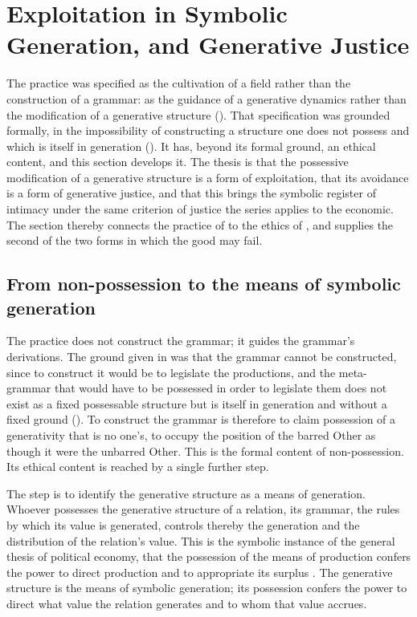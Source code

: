 \section{Exploitation in Symbolic Generation, and Generative Justice}
\label{p10:sec:exploitation}

\noindent
The practice was specified as the cultivation of a field rather than the construction of a grammar: as the guidance of a generative dynamics rather than the modification of a generative structure (). That specification was grounded formally, in the impossibility of constructing a structure one does not possess and which is itself in generation (). It has, beyond its formal ground, an ethical content, and this section develops it. The thesis is that the possessive modification of a generative structure is a form of exploitation, that its avoidance is a form of generative justice, and that this brings the symbolic register of intimacy under the same criterion of justice the series applies to the economic. The section thereby connects the practice of  to the ethics of , and supplies the second of the two forms in which the good may fail.

\subsection{From non-possession to the means of symbolic generation}
\label{p10:sec:exp-means}

The practice does not construct the grammar; it guides the grammar's derivations. The ground given in  was that the grammar cannot be constructed, since to construct it would be to legislate the productions, and the meta-grammar that would have to be possessed in order to legislate them does not exist as a fixed possessable structure but is itself in generation and without a fixed ground (). To construct the grammar is therefore to claim possession of a generativity that is no one's, to occupy the position of the barred Other as though it were the unbarred Other. This is the formal content of non-possession. Its ethical content is reached by a single further step.

The step is to identify the generative structure as a means of generation. Whoever possesses the generative structure of a relation, its grammar, the rules by which its value is generated, controls thereby the generation and the distribution of the relation's value. This is the symbolic instance of the general thesis of political economy, that the possession of the means of production confers the power to direct production and to appropriate its surplus \parencite{marx1976}. The generative structure is the means of symbolic generation; its possession confers the power to direct what value the relation generates and to whom that value accrues.

